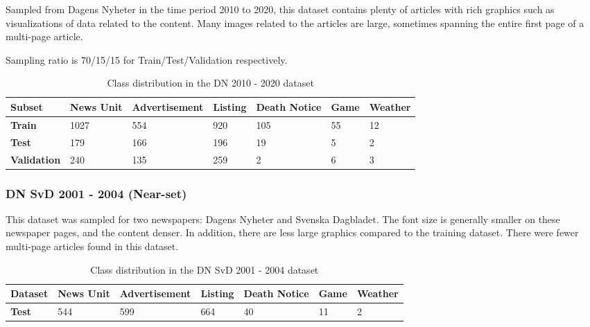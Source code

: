 \documentclass[oneside, english, bibtex]{kththesis}
\begin{document}
Sampled from Dagens Nyheter in the time period 2010 to 2020,
this dataset contains plenty of articles with rich graphics such as visualizations of data related to the content.
Many images related to the articles are large, sometimes spanning the entire first page of a multi-page article.

Sampling ratio is 70/15/15 for Train/Test/Validation respectively.

\begin{table}[H]
  \begin{center}
    \caption{Class distribution in the DN 2010 - 2020 dataset}
    \label{tab:trainclassdist}
    \begin{tabular}{l|l|l|l|l|l|l} %
    \textbf{Subset} & \textbf{News Unit} & \textbf{Advertisement} & \textbf{Listing} & \textbf{Death Notice} & \textbf{Game} & \textbf{Weather}  \\
    \hline
    \textbf{Train} & 1027 & 554 & 920 & 105 & 55 & 12 \\    \hline
    \textbf{Test} & 179 & 166 & 196 & 19 & 5 & 2 \\    \hline
    \textbf{Validation} & 240 & 135 & 259 & 2 & 6 & 3 \\    \hline
    \end{tabular}
  \end{center}
\end{table}

\subsubsection{DN SvD 2001 - 2004 (Near-set)}
\label{subsub:nearset}

This dataset was sampled for two newspapers: Dagens Nyheter and Svenska Dagbladet. The font size is generally smaller on these newspaper pages, and the content denser. In addition, there are less large graphics compared to the training dataset. There were fewer multi-page articles found in this dataset.

\begin{table}[H]
  \begin{center}
    \caption{Class distribution in the  DN SvD 2001 - 2004 dataset}
    \label{tab:insetclassdist}
    \begin{tabular}{l|l|l|l|l|l|l} %
    \textbf{Dataset} & \textbf{News Unit} & \textbf{Advertisement} & \textbf{Listing} & \textbf{Death Notice} & \textbf{Game} & \textbf{Weather}  \\
    \hline
    \textbf{Test} & 544 & 599 & 664 & 40 & 11 & 2 \\    \hline
    \end{tabular}
  \end{center}
\end{table}
\end{document}
